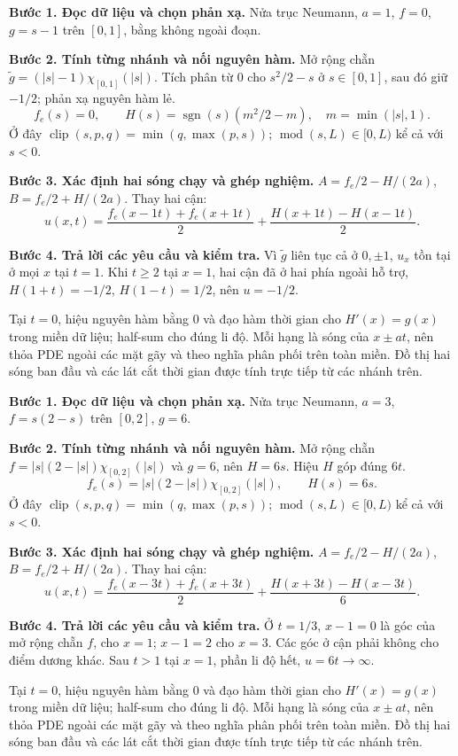 \textbf{Bước 1. Đọc dữ liệu và chọn phản xạ.} Nửa trục Neumann, $a=1$, $f=0$, $g=s-1$ trên $[0,1]$, bằng không ngoài đoạn.

\textbf{Bước 2. Tính từng nhánh và nối nguyên hàm.} Mở rộng chẵn $\widetilde g=(|s|-1)\chi_{[0,1]}(|s|)$. Tích phân từ $0$ cho $s^2/2-s$ ở $s\in[0,1]$, sau đó giữ $-1/2$; phản xạ nguyên hàm lẻ.
\[f_e(s)=0,\qquad H(s)=\operatorname{sgn}(s)(m^2/2-m),\quad m=\min(|s|,1).\]
Ở đây $\operatorname{clip}(s,p,q)=\min(q,\max(p,s))$; $\operatorname{mod}(s,L)\in[0,L)$ kể cả với $s<0$.

\textbf{Bước 3. Xác định hai sóng chạy và ghép nghiệm.} $A=f_e/2-H/(2a)$, $B=f_e/2+H/(2a)$. Thay hai cận:
\[u(x,t)=\frac{f_e(x-1t)+f_e(x+1t)}2+\frac{H(x+1t)-H(x-1t)}{2}.\]

\textbf{Bước 4. Trả lời các yêu cầu và kiểm tra.} Vì $\widetilde g$ liên tục cả ở $0,\pm1$, $u_x$ tồn tại ở mọi $x$ tại $t=1$. Khi $t\ge2$ tại $x=1$, hai cận đã ở hai phía ngoài hỗ trợ, $H(1+t)=-1/2$, $H(1-t)=1/2$, nên $u=-1/2$.

Tại $t=0$, hiệu nguyên hàm bằng $0$ và đạo hàm thời gian cho $H'(x)=g(x)$ trong miền dữ liệu; half-sum cho đúng li độ. Mỗi hạng là sóng của $x\pm at$, nên thỏa PDE ngoài các mặt gãy và theo nghĩa phân phối trên toàn miền. Đồ thị hai sóng ban đầu và các lát cắt thời gian được tính trực tiếp từ các nhánh trên.

\textbf{Bước 1. Đọc dữ liệu và chọn phản xạ.} Nửa trục Neumann, $a=3$, $f=s(2-s)$ trên $[0,2]$, $g=6$.

\textbf{Bước 2. Tính từng nhánh và nối nguyên hàm.} Mở rộng chẵn $f=|s|(2-|s|)\chi_{[0,2]}(|s|)$ và $g=6$, nên $H=6s$. Hiệu $H$ góp đúng $6t$.
\[f_e(s)=|s|(2-|s|)\chi_{[0,2]}(|s|),\qquad H(s)=6s.\]
Ở đây $\operatorname{clip}(s,p,q)=\min(q,\max(p,s))$; $\operatorname{mod}(s,L)\in[0,L)$ kể cả với $s<0$.

\textbf{Bước 3. Xác định hai sóng chạy và ghép nghiệm.} $A=f_e/2-H/(2a)$, $B=f_e/2+H/(2a)$. Thay hai cận:
\[u(x,t)=\frac{f_e(x-3t)+f_e(x+3t)}2+\frac{H(x+3t)-H(x-3t)}{6}.\]

\textbf{Bước 4. Trả lời các yêu cầu và kiểm tra.} Ở $t=1/3$, $x-1=0$ là góc của mở rộng chẵn $f$, cho $x=1$; $x-1=2$ cho $x=3$. Các góc ở cận phải không cho điểm dương khác. Sau $t>1$ tại $x=1$, phần li độ hết, $u=6t\to\infty$.

Tại $t=0$, hiệu nguyên hàm bằng $0$ và đạo hàm thời gian cho $H'(x)=g(x)$ trong miền dữ liệu; half-sum cho đúng li độ. Mỗi hạng là sóng của $x\pm at$, nên thỏa PDE ngoài các mặt gãy và theo nghĩa phân phối trên toàn miền. Đồ thị hai sóng ban đầu và các lát cắt thời gian được tính trực tiếp từ các nhánh trên.

